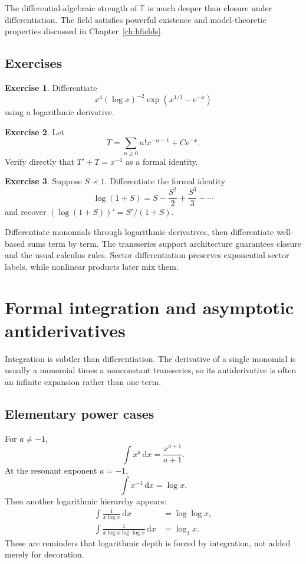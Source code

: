 \documentclass[11pt,openany]{book}
\theoremstyle{definition}
\newtheorem{exercise}{Exercise}[chapter]
\theoremstyle{plain}
\theoremstyle{remark}
\newcommand{\T}{\mathbb{T}}
\newcommand{\dd}{\,\mathrm{d}}
\newcommand{\e}{\mathrm{e}}
\newcommand{\precdom}{\prec}
\begin{document}
The differential-algebraic strength of $\T$ is much deeper than closure under differentiation. The field satisfies powerful existence and model-theoretic properties discussed in Chapter~\ref{ch:hfields}.

\section{Exercises}

\begin{exercise}
Differentiate
\[
 x^4(\log x)^{-2}\exp\!\left(x^{1/3}-\e^{-x}\right)
\]
using a logarithmic derivative.
\end{exercise}

\begin{exercise}
Let
\[
 T=\sum_{n\ge0}n!x^{-n-1}+C\e^{-x}.
\]
Verify directly that $T'+T=x^{-1}$ as a formal identity.
\end{exercise}

\begin{exercise}
Suppose $S\precdom1$. Differentiate the formal identity
\[
 \log(1+S)=S-\frac{S^2}{2}+\frac{S^3}{3}-\cdots
\]
and recover $(\log(1+S))'=S'/(1+S)$.
\end{exercise}

\begin{summarybox}
Differentiate monomials through logarithmic derivatives, then differentiate well-based sums term by term. The transseries support architecture guarantees closure and the usual calculus rules. Sector differentiation preserves exponential sector labels, while nonlinear products later mix them.
\end{summarybox}


\chapter{Formal integration and asymptotic antiderivatives}\label{ch:integration}

Integration is subtler than differentiation. The derivative of a single monomial is usually a monomial times a nonconstant transseries, so its antiderivative is often an infinite expansion rather than one term.

\section{Elementary power cases}

For $a\ne-1$,
\[
 \int x^a\dd x=\frac{x^{a+1}}{a+1}.
\]
At the resonant exponent $a=-1$,
\[
 \int x^{-1}\dd x=\log x.
\]
Then another logarithmic hierarchy appears:
\begin{align*}
 \int\frac{1}{x\log x}\dd x&=\log\log x,\\
 \int\frac{1}{x\log x\log\log x}\dd x&=\log_3x.
\end{align*}
These are reminders that logarithmic depth is forced by integration, not added merely for decoration.
\end{document}
